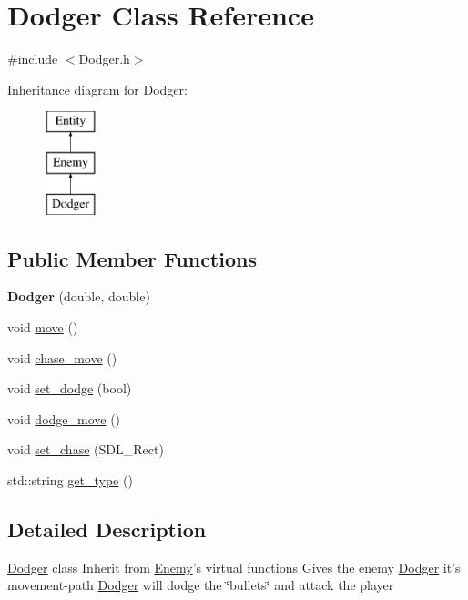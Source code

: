 \hypertarget{class_dodger}{\section{\-Dodger \-Class \-Reference}
\label{class_dodger}
}


{\ttfamily \#include $<$\-Dodger.\-h$>$}

\-Inheritance diagram for \-Dodger\-:\begin{figure}[H]
\begin{center}
\leavevmode
\includegraphics[height=3.000000cm]{class_dodger}
\end{center}
\end{figure}
\subsection*{\-Public \-Member \-Functions}
\begin{DoxyCompactItemize}
\item 
\hypertarget{class_dodger_a4607347dc88cdbadbeefdfb6f8d7ac59}{{\bfseries \-Dodger} (double, double)}\label{class_dodger_a4607347dc88cdbadbeefdfb6f8d7ac59}

\item 
void \hyperlink{class_dodger_ae9fa20d61b2e80b53ea0727586745349}{move} ()
\item 
void \hyperlink{class_dodger_a4664c9695d4f6c45ef7e763d0365799d}{chase\-\_\-move} ()
\item 
void \hyperlink{class_dodger_ad9da61feabc4691fbf99f7628c20248e}{set\-\_\-dodge} (bool)
\item 
void \hyperlink{class_dodger_a94477f06fcca2d02fe193e2479595622}{dodge\-\_\-move} ()
\item 
void \hyperlink{class_dodger_a31efe1819c40cdac518d8e9c39b4912b}{set\-\_\-chase} (\-S\-D\-L\-\_\-\-Rect)
\item 
std\-::string \hyperlink{class_dodger_a23da0ffb950d8547c40b2cca2013a6d3}{get\-\_\-type} ()
\end{DoxyCompactItemize}


\subsection{\-Detailed \-Description}
\hyperlink{class_dodger}{\-Dodger} class \-Inherit from \hyperlink{class_enemy}{\-Enemy}'s virtual functions \-Gives the enemy \hyperlink{class_dodger}{\-Dodger} it's movement-\/path \hyperlink{class_dodger}{\-Dodger} will dodge the \char`\"{}bullets\char`\"{} and attack the player 

